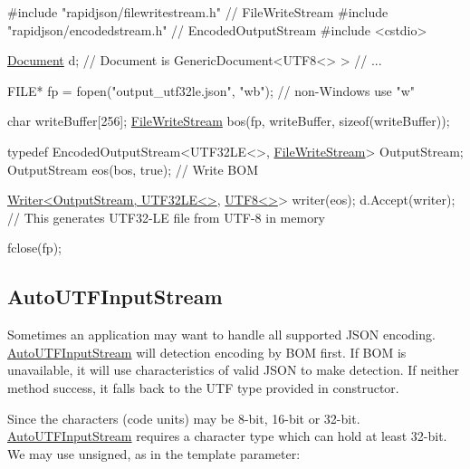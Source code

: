 \begin{DoxyCode}
\textcolor{preprocessor}{#include "rapidjson/filewritestream.h"}  \textcolor{comment}{// FileWriteStream}
\textcolor{preprocessor}{#include "rapidjson/encodedstream.h"}    \textcolor{comment}{// EncodedOutputStream}
\textcolor{preprocessor}{#include <cstdio>}

\hyperlink{class_generic_document}{Document} d;         \textcolor{comment}{// Document is GenericDocument<UTF8<> > }
\textcolor{comment}{// ...}

FILE* fp = fopen(\textcolor{stringliteral}{"output\_utf32le.json"}, \textcolor{stringliteral}{"wb"}); \textcolor{comment}{// non-Windows use "w"}

\textcolor{keywordtype}{char} writeBuffer[256];
\hyperlink{class_file_write_stream}{FileWriteStream} bos(fp, writeBuffer, \textcolor{keyword}{sizeof}(writeBuffer));

\textcolor{keyword}{typedef} EncodedOutputStream<UTF32LE<>, \hyperlink{class_file_write_stream}{FileWriteStream}> OutputStream;
OutputStream eos(bos, \textcolor{keyword}{true});   \textcolor{comment}{// Write BOM}

\hyperlink{class_writer}{Writer<OutputStream, UTF32LE<>}, \hyperlink{struct_u_t_f8}{UTF8<>}> writer(eos);
d.Accept(writer);   \textcolor{comment}{// This generates UTF32-LE file from UTF-8 in memory}

fclose(fp);
\end{DoxyCode}
\hypertarget{md_Commun_Externe_RapidJSON_doc_stream.zh-cn_AutoUTFInputStream}{}\subsection{Auto\+U\+T\+F\+Input\+Stream}\label{md_Commun_Externe_RapidJSON_doc_stream.zh-cn_AutoUTFInputStream}
Sometimes an application may want to handle all supported J\+S\+ON encoding. {\ttfamily \hyperlink{class_auto_u_t_f_input_stream}{Auto\+U\+T\+F\+Input\+Stream}} will detection encoding by B\+OM first. If B\+OM is unavailable, it will use characteristics of valid J\+S\+ON to make detection. If neither method success, it falls back to the U\+TF type provided in constructor.

Since the characters (code units) may be 8-\/bit, 16-\/bit or 32-\/bit. {\ttfamily \hyperlink{class_auto_u_t_f_input_stream}{Auto\+U\+T\+F\+Input\+Stream}} requires a character type which can hold at least 32-\/bit. We may use {\ttfamily unsigned}, as in the template parameter\+:


